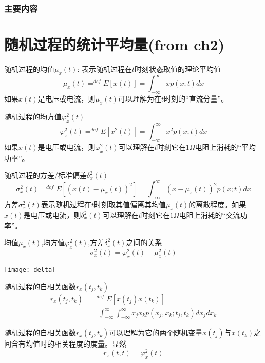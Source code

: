 \begin{frame}
  \frametitle{主要内容}
  \tableofcontents[hideallsubsections]
\end{frame}

\section{随机过程的统计平均量(from ch2)}

\begin{frame}
\begin{block}{随机过程的均值$\mu_x(t)$: 表示随机过程在$t$时刻状态取值的理论平均值}
	\[\mu_x(t)\mathop{=}^{def}E[x(t)]=\int_{-\infty}^{\infty}xp(x;t)dx \]
	如果$x(t)$是电压或电流，则$\mu_x(t)$可以理解为在$t$时刻的``直流分量''。
\end{block}

\begin{block}{随机过程的均方值$\varphi_x^2(t)$}
	\[\varphi_x^2(t)\mathop{=}^{def}E[x^2(t)]=\int_{-\infty}^{\infty}x^2p(x;t)dx \]
	如果$x(t)$是电压或电流，则$\varphi_x^2(t)$可以理解在$t$时刻它在$1\Omega$电阻上消耗的``平均功率''。
\end{block}
\end{frame}

\begin{frame}
\begin{block}{随机过程的方差/标准偏差$\delta_x^2(t)$}
	\[\sigma_x^2(t)\mathop{=}^{def}E[(x(t)-\mu_x(t))^2]=\int_{-\infty}^{\infty}(x-\mu_x(t))^2p(x;t)dx \]
	方差$\sigma_x^2(t)$表示随机过程在$t$时刻取其值偏离其均值$\mu_x(t)$的离散程度。如果$x(t)$是电压或电流，则$\delta_x^2(t)$可以理解在$t$时刻它在$1\Omega$电阻上消耗的``交流功率''。
\end{block}
\begin{block}{均值$\mu_x(t)$,均方值$\varphi_x^2(t)$,方差$\delta_x^2(t)$之间的关系}
	\[\sigma_x^2(t)=\varphi_x^2(t)-\mu_x^2(t)\]
\end{block}
\texttt{[image: delta]}
\end{frame}

\begin{frame}
\begin{block}{随机过程的自相关函数$r_x(t_j,t_k)$}
	\begin{align*}
	r_x(t_j,t_k)&\mathop{=}^{def}E[x(t_j)x(t_k)]\\
	&=\int_{-\infty}^{\infty}	\int_{-\infty}^{\infty}x_jx_kp(x_j,x_k;t_j,t_k)dx_jdx_k
	\end{align*}
\end{block}
随机过程的自相关函数$r_x(t_j,t_k)$可以理解为它的两个随机变量$x(t_j)$与$x(t_k)$之间含有均值时的相关程度的度量。显然
\[r_x(t,t)=\varphi_x^2(t)\]
\end{frame}

